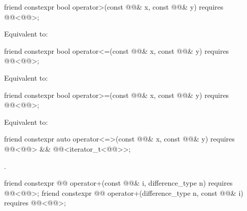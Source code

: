 %
\begin{itemdecl}
friend constexpr bool operator>(const @@& x, const @@& y)
  requires @@<@@>;
\end{itemdecl}

\begin{itemdescr}
\pnum
\effects
Equivalent to: 
\end{itemdescr}

%
\begin{itemdecl}
friend constexpr bool operator<=(const @@& x, const @@& y)
  requires @@<@@>;
\end{itemdecl}

\begin{itemdescr}
\pnum
\effects
Equivalent to: 
\end{itemdescr}

%
\begin{itemdecl}
friend constexpr bool operator>=(const @@& x, const @@& y)
  requires @@<@@>;
\end{itemdecl}

\begin{itemdescr}
\pnum
\effects
Equivalent to: 
\end{itemdescr}

%
\begin{itemdecl}
friend constexpr auto operator<=>(const @@& x, const @@& y)
  requires @@<@@> &&
           @@<iterator_t<@@>>;
\end{itemdecl}

\begin{itemdescr}
\pnum
\returns
{}.
\end{itemdescr}

%
\begin{itemdecl}
friend constexpr @@ operator+(const @@& i, difference_type n)
  requires @@<@@>;
friend constexpr @@ operator+(difference_type n, const @@& i)
  requires @@<@@>;
\end{itemdecl}

